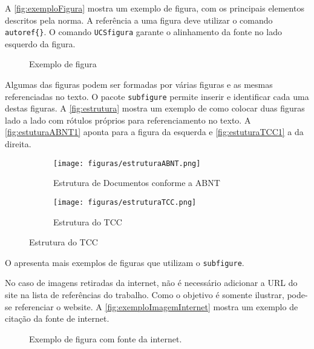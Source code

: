 A \autoref{fig:exemploFigura} mostra um exemplo de figura, com os principais elementos descritos pela norma. A referência a uma figura deve utilizar o comando \verb!autoref{}!. O comando \texttt{UCSfigura} garante o alinhamento da fonte no lado esquerdo da figura.  

    \begin{figure}[!ht]
    	\caption{Exemplo de figura}
    	\centering 
    	\label{fig:exemploFigura}
    \end{figure}   

Algumas das figuras podem ser formadas por várias figuras e as mesmas referenciadas no texto. O pacote \texttt{subfigure}  permite inserir e identificar cada uma destas figuras. A \autoref{fig:estrutura} mostra um exemplo de como colocar duas figuras lado a lado com rótulos próprios para referenciamento no texto. A \autoref{fig:estuturaABNT1} aponta para a figura da esquerda e \autoref{fig:estuturaTCC1} a da direita. 


\begin{figure}[!ht]
	\centering
	\caption{Estruturas de trabalhos pela ABNT e o adotado pela Área da Informática da UCS.}
	\label{fig:estrutura} 
	\begin{subfigure}{0.45\textwidth}
		\centering
		\texttt{[image: figuras/estruturaABNT.png]}
		\caption{Estrutura de Documentos conforme a ABNT}
		\label{fig:estuturaABNT1}
	\end{subfigure}
	\begin{subfigure}{0.45\textwidth}
		\centering
		\texttt{[image: figuras/estruturaTCC.png]}
		\caption{Estrutura do TCC }
		\label{fig:estuturaTCC1}
	\end{subfigure}
			
		
\end{figure}

O  apresenta mais exemplos de figuras que utilizam o \texttt{subfigure}. 

No caso de imagens retiradas da internet, não é necessário adicionar a URL do site na lista de referências do trabalho. Como o objetivo é somente ilustrar, pode-se referenciar o website. A \autoref{fig:exemploImagemInternet} mostra um exemplo de citação da fonte de internet. 

\begin{figure}[!ht]
	\caption{Exemplo de figura com fonte da internet.}
	\centering 
	\label{fig:exemploImagemInternet}
\end{figure} 

